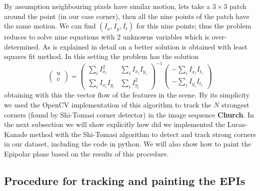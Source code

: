 \begin{itemize}
\bigskip

By assumption neighbouring pixels have similar motion, lets take a $3\times 3$ patch around the point (in our case corner), then all the nine points of the patch have the same motion. We can find $(I_x,I_y,I_t)$ for this nine points; thus the problem reduces to solve nine equations with 2 unknowns variables which is over-determined. As is explained in detail on \cite{LucasKanade} a better solution is obtained with least squares fit method. In this setting the problem has the solution
\begin{equation}
\label{eq:C2S5E13}
\left( 
\begin{matrix}
u \\
v 
\end{matrix}
\right) = 
\left(
\begin{matrix}
\sum_i I_{x_i}^2 & \sum_i I_{x_i}I_{y_i} \\
\sum_i I_{x_i}I_{y_i} & \sum_i I_{y_i}^2 
\end{matrix}
\right)^{-1}
\left(
\begin{matrix}
-\sum_i I_{x_i}I_{t_i}\\
-\sum_i I_{y_i}I_{t_i}
\end{matrix}
\right)
\end{equation}
obtaining with this the vector flow of the features in the scene. By its simplicity we used the OpenCV implementation of this algorithm to track the $N$ strongest corners (found by Shi-Tomasi corner detector) in the image sequence \textbf{Church}. In the next subsection we will show explicitly how did we implemented the Lucas-Kanade method with the Shi-Tomasi algorithm to detect and track strong corners in our dataset, including the code in python. We will also show how to paint the Epipolar plane based on the results of this procedure. 
\end{itemize}
 
\subsection{Procedure for tracking and painting the EPIs}
\label{sec:proc_track}

